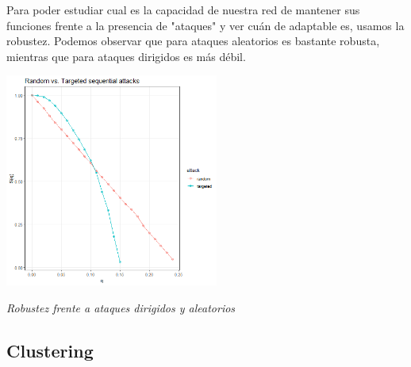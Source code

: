 Para poder estudiar cual es la capacidad de nuestra red de mantener sus funciones frente a la presencia de "ataques" y ver cuán de adaptable es, usamos la robustez. Podemos observar que para ataques aleatorios es bastante robusta, mientras que para ataques dirigidos es más débil. 
\begin{center}
	\includegraphics[width=70mm,scale=1.2]{report/figures/sequential_attacks.png}
	\caption{\textit{Robustez frente a ataques dirigidos y aleatorios}}
\end{center}

\subsection{Clustering}




